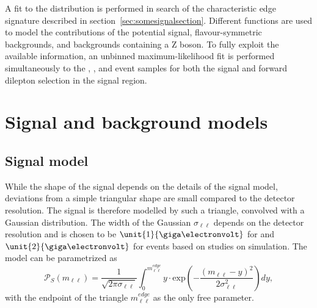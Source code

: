A fit to the \mll distribution is performed in search of the characteristic edge signature described in section~\ref{sec:somesignalsection}. Different functions are used to model the contributions of the potential signal, flavour-symmetric backgrounds, and backgrounds containing a Z boson. To fully exploit the available information, an unbinned maximum-likelihood fit is performed simultaneously to the \EE, \MM, and \EM event samples for both the signal and forward dilepton selection in the signal region.

\section{Signal and background models}
\subsection{Signal model}
While the shape of the signal depends on the details of the signal model, deviations from a simple triangular shape are small compared to the detector resolution. The signal is therefore modelled by such a triangle, convolved with a Gaussian distribution. The width of the Gaussian $\sigma_{\ell\ell}$ depends on the detector resolution and is chosen to be $\unit{1}{\giga\electronvolt}$ for \MM and $\unit{2}{\giga\electronvolt}$ for \EE events based on studies on simulation. The model can be parametrized as
\begin{equation*}
 {\mathcal{P}}_{S}(m_{\ell\ell}) = \frac{1}{\sqrt{2\pi\sigma_{\ell\ell}}} \int_{0}^{m_{\ell\ell}^{edge}} y \cdot \textrm{exp}\left( -\frac{(m_{\ell\ell}-y)^2}{2\sigma_{\ell\ell}^{2}}\right) dy,
\end{equation*}
with the endpoint of the triangle $m_{\ell\ell}^{edge}$ as the only free parameter.


